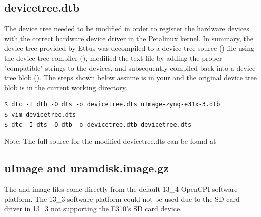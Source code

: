\begin{appendices}
\subsection{devicetree.dtb}
The device tree needed to be modified in order to register the hardware devices with the correct hardware device driver in the Petalinux kernel. In summary, the device tree provided by Ettus was decompiled to a device tree source () file using the device tree compiler (), modified the text file by adding the proper "compatible" strings to the devices, and subsequently compiled back into a device tree blob (). The steps shown below assume  is in your  and the original device tree blob is in the current working directory.
\begin{lstlisting}[showspaces=false]
$ dtc -I dtb -O dts -o devicetree.dts uImage-zynq-e31x-3.dtb
$ vim devicetree.dts
$ dtc -I dts -O dtb -o devicetree.dtb devicetree.dts
\end{lstlisting}
Note: The full source for the modified devicetree.dts can be found at

\subsection{uImage and uramdisk.image.gz}
The  and  image files come directly from the default 13\_4 OpenCPI software platform. The 13\_3 software platform could not be used due to the SD card driver in 13\_3 not supporting the E310's SD card device.
\end{appendices}


